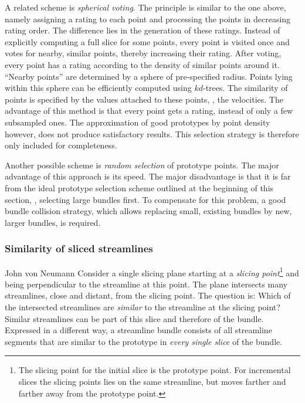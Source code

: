 A related scheme is \emph{spherical voting}. The principle is similar to the one above, namely assigning a rating to each point and processing the points in decreasing rating order. The difference lies in the generation of these ratings. Instead of explicitly computing a full slice for some points, every point is visited once and votes for nearby, similar points, thereby increasing their rating. After voting, every point has a rating according to the density of similar points around it. ``Nearby points'' are determined by a sphere of pre-specified radius. Points lying within this sphere can be efficiently computed using $kd$-trees. The similarity of points is specified by the values attached to these points, \eg, the velocities. The advantage of this method is that every point gets a rating, instead of only a few subsampled ones. The approximation of good prototypes by point density however, does not produce satisfactory results. This selection strategy is therefore only included for completeness.

Another possible scheme is \emph{random selection} of prototype points. The major advantage of this approach is its speed. The major disadvantage is that it is far from the ideal prototype selection scheme outlined at the beginning of this section, \ie, selecting large bundles first. To compensate for this problem, a good bundle collision strategy, which allows replacing small, existing bundles by new, larger bundles, is required.


\subsubsection{Similarity of sliced streamlines}
\label{sec:theory:similarity-of-sliced-streamlines}

{John von Neumann}%
%
Consider a single slicing plane starting at a \emph{slicing point}\footnote{The slicing point for the initial slice is the prototype point. For incremental slices the slicing points lies on the same streamline, but moves farther and farther away from the prototype point.} and being perpendicular to the streamline at this point. The plane intersects many streamlines, close and distant, from the slicing point. The question is: Which of the intersected streamlines are \emph{similar} to the streamline at the slicing point? Similar streamlines can be part of this slice and therefore of the bundle. Expressed in a different way, a streamline bundle consists of all streamline segments that are similar to the prototype in \emph{every single slice} of the bundle.

